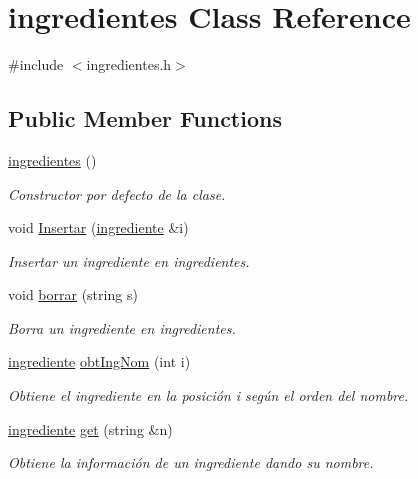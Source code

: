 \hypertarget{classingredientes}{}\section{ingredientes Class Reference}
\label{classingredientes}


{\ttfamily \#include $<$ingredientes.\+h$>$}

\subsection*{Public Member Functions}
\begin{DoxyCompactItemize}
\item 
\hyperlink{classingredientes_adb3e000aa798184c7253c401f165c1a5}{ingredientes} ()
\begin{DoxyCompactList}\small\item\em Constructor por defecto de la clase. \end{DoxyCompactList}\item 
void \hyperlink{classingredientes_abbf5ea48179d79c13e5abd6c09393ada}{Insertar} (\hyperlink{classingrediente}{ingrediente} \&i)
\begin{DoxyCompactList}\small\item\em Insertar un ingrediente en ingredientes. \end{DoxyCompactList}\item 
void \hyperlink{classingredientes_a35403b690f689a21f4d179e25e25ff48}{borrar} (string s)
\begin{DoxyCompactList}\small\item\em Borra un ingrediente en ingredientes. \end{DoxyCompactList}\item 
\hyperlink{classingrediente}{ingrediente} \hyperlink{classingredientes_ad77fd43aa6ab52bb7f0bf547cb4bc777}{obt\+Ing\+Nom} (int i)
\begin{DoxyCompactList}\small\item\em Obtiene el ingrediente en la posición i según el orden del nombre. \end{DoxyCompactList}\item 
\hyperlink{classingrediente}{ingrediente} \hyperlink{classingredientes_a920e0fbbf533a8ba934cfc485b2e44c0}{get} (string \&n)
\begin{DoxyCompactList}\small\item\em Obtiene la información de un ingrediente dando su nombre. \end{DoxyCompactList}\item 

\end{DoxyCompactItemize}
